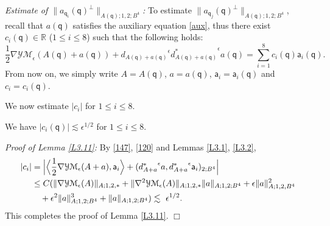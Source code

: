 \documentclass[11pt]{article}
\numberwithin{equation}{section} \setlength{\topmargin}{-35pt}
\newcommand{\R}{\mathbb{R}}
\newcommand{\YMe}{\mathcal{YM}_{\epsilon}}
\newcommand{\q}{\mathsf{q}}
\newcommand{\A}{\mathsf{a}}
\begin{document}
\medskip
\noindent\textit{Estimate of
$\|a_{\q_i}(\q)^{\perp}\|_{A(\q);1,2;B^4}$:} To estimate
$\|a_{\q_j}(\q)^{\perp}\|_{A(\q);1,2;B^4}$, recall that $a(\q)$
satisfies the auxiliary equation \eqref{aux}, thus there exist
$c_i(\q)\in\R$ ($1\le i\le 8$) such that the following holds:
\begin{equation}
\label{147}
\frac{1}{2}\nabla\YMe(A(\q)+a(\q))+{d_{A(\q)+a(\q)}}^{\epsilon}{d_{A(\q)+a(\q)}^{\ast}}^{\epsilon}a(\q)=\sum_{i=1}^8c_i(\q)\A_i(\q).
\end{equation}
From now on, we simply write $A=A(\q)$, $a=a(\q)$, $\A_i=\A_i(\q)$
and $c_i=c_i(\q)$.

We now estimate $|c_i|$ for $1\le i\le 8$.
\begin{lemma}
\label{L3.11} We have $|c_i(\q)|\lesssim\epsilon^{1/2}$ for $1\le
i\le 8$.
\end{lemma}
\textit{Proof of Lemma \ref{L3.11}:} By \eqref{147}, \eqref{120} and
Lemmas \ref{L3.1}, \ref{L3.2},
\begin{align}
|c_i|&=\Big|\Big\langle\frac{1}{2}\nabla\YMe(A+a),\A_i\Big\rangle+({d_{A+a}^{\ast}}^{\epsilon}a,{d_{A+a}^{\ast}}^{\epsilon}\A_i)_{2;B^4}\Big|\notag\\
&\le C(\|\nabla\YMe(A)\|_{A;1,2,\ast}+\|\nabla^2\YMe(A)\|_{A;1,2,\ast}\|a\|_{A;1,2;B^4}+\epsilon\|a\|_{A;1,2,B^4}^2\notag\\
&\quad+\epsilon^2\|a\|_{A;1,2;B^4}^3+\|a\|_{A;1,2;B^4})\lesssim~\epsilon^{1/2}.
\end{align}
This completes the proof of Lemma \ref{L3.11}. \hfill$\Box$
\end{document}
